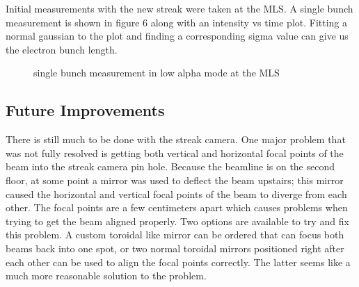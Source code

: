 \documentclass[%
 reprint,%
 amssymb, amsmath,%
 aip,cha,%
]{revtex4-1}
\begin{document}
Initial measurements with the new streak were taken at the MLS\cite{Note4}. A single bunch measurement is shown in figure 6 along with an intensity vs time plot. Fitting a normal gaussian to the plot and finding a corresponding sigma value can give us the electron bunch length.
\begin{figure}[htb]
\begin{center}
\caption{single bunch measurement in low alpha mode at the MLS}
\label{measurement}
\end{center}
\end{figure}

\subsection{Future Improvements}
There is still much to be done with the streak camera. One major problem that was not fully resolved is getting both vertical and horizontal focal points of the beam into the streak camera pin hole. Because the beamline is on the second floor, at some point a mirror was used to deflect the beam upstairs; this mirror caused the horizontal and vertical focal points of the beam to diverge from each other. The focal points are a few centimeters apart which causes problems when trying to get the beam aligned properly. Two options are available to try and fix this problem. A custom toroidal like mirror can be ordered that can focus both beams back into one spot, or two normal toroidal mirrors positioned right after each other can be used to align the focal points correctly. The latter seems like a much more reasonable solution to the problem.
\end{document}
